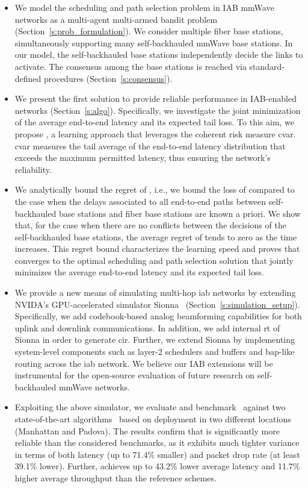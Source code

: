 \begin{itemize}
\item We model the scheduling and path selection problem in IAB mmWave networks as a multi-agent multi-armed bandit problem (Section~\ref{s:prob_formulation}). We consider multiple fiber base stations, simultaneously supporting many self-backhauled mmWave base stations. In our model, the self-backhauled base stations independently decide the links to activate. The consensus among the base stations is reached via standard-defined procedures (Section~\ref{s:consensus}).
\item We present the first solution to provide reliable performance in IAB-enabled networks (Section~\ref{s:algo}). Specifically, we investigate the joint minimization of the average end-to-end latency and its expected tail loss.  
To this aim, we propose \name{}, a learning approach that leverages the coherent risk measure \gls{cvar}\cite{Rockafellar2000}.
\gls{cvar} measures the tail average of the end-to-end latency distribution that exceeds the maximum permitted latency, thus ensuring the network's reliability.
\item We analytically bound the regret of \name{}, i.e., we bound the loss of \name{} compared to the case when the delays associated to all end-to-end paths between self-backhauled base stations and fiber base stations are known a priori. We show that, for the case when there are no conflicts between the decisions of the self-backhauled base stations, the average regret of \name{} tends to zero as the time increases. This regret bound characterizes the learning speed and proves that \name{} converges to the optimal scheduling and path selection solution that jointly minimizes the average end-to-end latency and its expected tail loss.
\item We provide a new means of simulating multi-hop \gls{iab} networks by extending NVIDA's GPU-accelerated simulator Sionna~\cite{hoydis2022sionna} (Section~\ref{s:simulation_setup}). Specifically, we add codebook-based analog beamforming capabilities for both uplink and downlink communications. In addition, we add internal \gls{rt} of Sionna in order to generate \gls{cir}. Further, we extend Sionna by implementing system-level components such as layer-2 schedulers and buffers and \gls{bap}-like routing across the \gls{iab} network. We believe our IAB extensions will be instrumental for the open-source evaluation of future research on self-backhauled mmWave networks.

\item Exploiting the above simulator, we evaluate and benchmark~\name{} against two state-of-the-art algorithms~\cite{ortiz2019scaros, polese2018distributed} based on deployment in two different locations (Manhattan and Padova). The results confirm that \name{} is significantly more reliable than the considered benchmarks, as it exhibits much tighter variance in terms of both latency (up to 71.4\% smaller) and packet drop rate (at least 39.1\% lower). Further, \name{} achieves up to 43.2\% lower average latency and 11.7\% higher average throughput than the reference schemes. \end{itemize}

